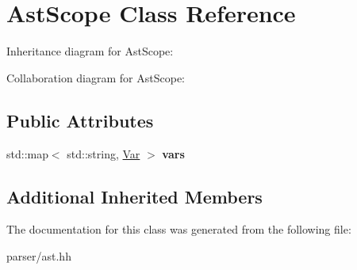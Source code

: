 \hypertarget{classAstScope}{}\section{Ast\+Scope Class Reference}
\label{classAstScope}


Inheritance diagram for Ast\+Scope\+:


Collaboration diagram for Ast\+Scope\+:
\subsection*{Public Attributes}
\begin{DoxyCompactItemize}
\item 
\mbox{\label{classAstScope_ab1ab4f0a1a1e240762ff5b0e68e4d141}} 
std\+::map$<$ std\+::string, \hyperlink{structVar}{Var} $>$ {\bfseries vars}
\end{DoxyCompactItemize}
\subsection*{Additional Inherited Members}


The documentation for this class was generated from the following file\+:\begin{DoxyCompactItemize}
\item 
parser/ast.\+hh\end{DoxyCompactItemize}

